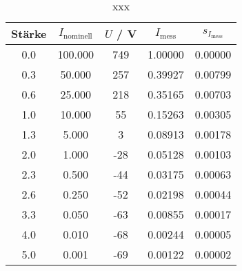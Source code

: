 \begin{table}[H]
\caption{xxx}
\begin{center}
\begin{tabular}{|c|c|c|c|c|}
  \hline
  Stärke & $I_\text{nominell}$ & $U$ / V & $I_\text{mess}$ & $s_{I_\text{mess}}$ \\ \hline
  0.0 & 100.000 & 749 & 1.00000 & 0.00000 \\ \hline
  0.3 & 50.000 & 257 & 0.39927 & 0.00799 \\ \hline
  0.6 & 25.000 & 218 & 0.35165 & 0.00703 \\ \hline
  1.0 & 10.000 & 55 & 0.15263 & 0.00305 \\ \hline
  1.3 & 5.000 & 3 & 0.08913 & 0.00178 \\ \hline
  2.0 & 1.000 & -28 & 0.05128 & 0.00103 \\ \hline
  2.3 & 0.500 & -44 & 0.03175 & 0.00063 \\ \hline
  2.6 & 0.250 & -52 & 0.02198 & 0.00044 \\ \hline
  3.3 & 0.050 & -63 & 0.00855 & 0.00017 \\ \hline
  4.0 & 0.010 & -68 & 0.00244 & 0.00005 \\ \hline
  5.0 & 0.001 & -69 & 0.00122 & 0.00002 \\ \hline
\end{tabular}
\end{center}
\label{tab:deh:dnfilter}
\end{table}
